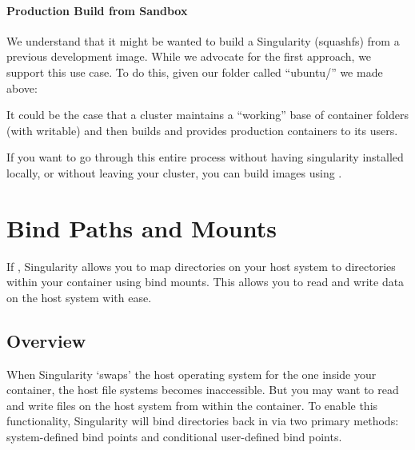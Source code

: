 \documentclass[letterpaper,10pt,english]{sphinxmanual}
\begin{document}
\subsubsection{Production Build from Sandbox}
\label{\detokenize{singularity_flow:production-build-from-sandbox}}
We understand that it might be wanted to build a Singularity (squashfs)
from a previous development image. While we advocate for the first
approach, we support this use case. To do this, given our folder called
“ubuntu/” we made above:

%
\begin{sphinxVerbatim}[commandchars=\\\{\}]
    
\end{sphinxVerbatim}

It could be the case that a cluster maintains a “working” base of
container folders (with writable) and then builds and provides
production containers to its users.

If you want to go through this entire process without having
singularity installed locally, or without leaving your cluster, you
can build images using .


\chapter{Bind Paths and Mounts}
\label{\detokenize{bind_paths_and_mounts:bind-paths-and-mounts}}\label{\detokenize{bind_paths_and_mounts:id1}}\label{\detokenize{bind_paths_and_mounts::doc}}\label{\detokenize{bind_paths_and_mounts:sec-bindpaths}}
If , Singularity allows you to map
directories on your host system to directories within your container
using bind mounts. This allows you to read and write data on the host
system with ease.


\section{Overview}
\label{\detokenize{bind_paths_and_mounts:overview}}
When Singularity ‘swaps’ the host operating system for the one inside
your container, the host file systems becomes inaccessible. But you may
want to read and write files on the host system from within the
container. To enable this functionality, Singularity will bind
directories back in via two primary methods: system-defined bind points
and conditional user-defined bind points.
\end{document}
